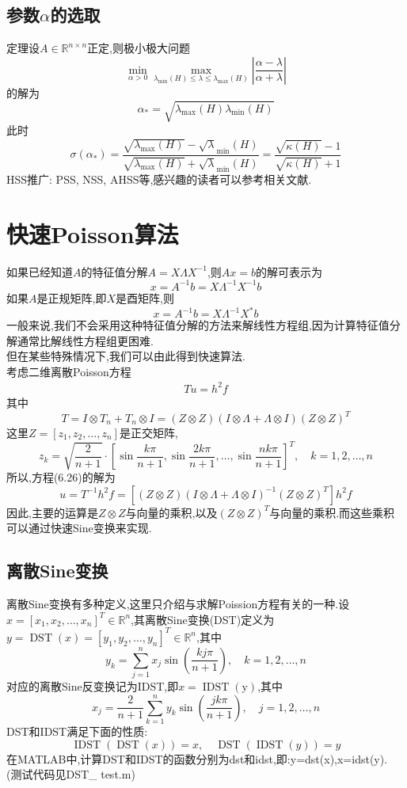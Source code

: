\documentclass[12pt,a4paper]{article}
\begin{document}
\subsection*{参数$\alpha$的选取}
{\color{blue}定理}\qquad 设$A \in \mathbb{R}^{n \times n}$正定,则极小极大问题
$$
\min _{\alpha>0} \max _{\lambda_{\min }(H) \leq \lambda \leq \lambda_{\max }(H)}\left|\frac{\alpha-\lambda}{\alpha+\lambda}\right|
$$
的解为
$$
\alpha_{*}=\sqrt{\lambda_{\max }(H) \lambda_{\min }(H)}
$$
此时
$$
\sigma\left(\alpha_{*}\right)=\frac{\sqrt{\lambda_{\max }(H)}-\sqrt{\lambda}_{\min }(H)}{\sqrt{\lambda_{\max }(H)}+\sqrt{\lambda}_{\min }(H)}=\frac{\sqrt{\kappa(H)}-1}{\sqrt{\kappa(H)}+1}
$$
HSS推广: PSS, NSS, AHSS等,感兴趣的读者可以参考相关文献.\\
\section{\color{blue}快速Poisson算法}
如果已经知道$A$的特征值分解$A=X \Lambda X^{-1}$,则$Ax=b$的解可表示为
$$
x=A^{-1} b=X \Lambda^{-1} X^{-1} b
$$
如果$A$是正规矩阵,即$X$是酉矩阵,则
$$
x=A^{-1} b=X \Lambda^{-1} X^{*} b
$$
一般来说,我们不会采用这种特征值分解的方法来解线性方程组,因为计算特征值分解通常比解线性方程组更困难.\\
但在某些特殊情况下,我们可以由此得到快速算法.\\
考虑二维离散Poisson方程
\begin{align*}
T u=h^{2} f
\tag{6.26}
\end{align*}
其中
$$
T=I \otimes T_{n}+T_{n} \otimes I=(Z \otimes Z)(I \otimes \Lambda+\Lambda \otimes I)(Z \otimes Z)^{T}
$$
这里$Z=\left[z_{1}, z_{2}, \ldots, z_{n}\right]$是正交矩阵,
$$
z_{k}=\sqrt{\frac{2}{n+1}} \cdot\left[\sin \frac{k \pi}{n+1}, \sin \frac{2 k \pi}{n+1}, \ldots, \sin \frac{n k \pi}{n+1}\right]^{T}, \quad k=1,2, \ldots, n
$$
所以,方程(6.26)的解为
$$
u=T^{-1} h^{2} f=\left[(Z \otimes Z)(I \otimes \Lambda+\Lambda \otimes I)^{-1}(Z \otimes Z)^{T}\right] h^{2} f
$$
因此,主要的运算是$Z \otimes Z$与向量的乘积,以及$(Z \otimes Z)^{T}$与向量的乘积.而这些乘积可以通过快速Sine变换来实现.\\
\subsection*{离散Sine变换}
离散Sine变换有多种定义,这里只介绍与求解Poission方程有关的一种.设$x=\left[x_{1}, x_{2}, \ldots, x_{n}\right]^{T} \in \mathbb{R}^{n}$,其{\color{blue}离散Sine变换(DST)}定义为$y=\operatorname{DST}(x)=\left[y_{1}, y_{2}, \ldots, y_{n}\right]^{T} \in \mathbb{R}^{n}$,其中
$$
y_{k}=\sum_{j=1}^{n} x_{j} \sin \left(\frac{k j \pi}{n+1}\right), \quad k=1,2, \ldots, n
$$
对应的离散Sine反变换记为IDST,即$x=\operatorname{IDST}(\mathrm{y})$,其中  
$$
x_{j}=\frac{2}{n+1} \sum_{k=1}^{n} y_{k} \sin \left(\frac{j k \pi}{n+1}\right), \quad j=1,2, \ldots, n
$$
DST和IDST满足下面的性质:
$$
\operatorname{IDST}(\operatorname{DST}(x))=x, \quad \operatorname{DST}(\operatorname{IDST}(y))=y
$$
在MATLAB中,计算DST和IDST的函数分别为{\color{blue}dst}和{\color{blue}idst},即:{\color{blue}y=dst(x),x=idst(y)}. (测试代码见{\color{blue}DST\_ test.m})\\
\end{document}
